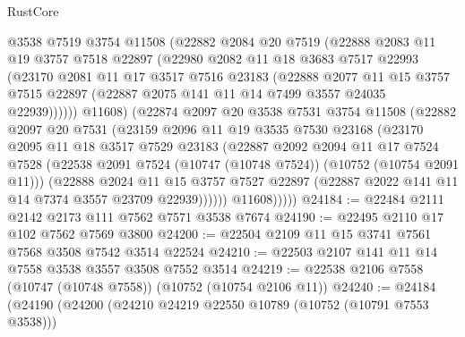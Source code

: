 \begin{lexlean}{RustCore}
\begin{coremodule}
              @3538
              @7519
              @3754
              @11508
              (@22882
                @2084
                @20
                @7519
                (@22888
                  @2083
                  @11
                  @19
                  @3757
                  @7518
                  @22897
                  (@22980
                    @2082
                    @11
                    @18
                    @3683
                    @7517
                    @22993
                    (@23170
                      @2081
                      @11
                      @17
                      @3517
                      @7516
                      @23183
                      (@22888
                        @2077
                        @11
                        @15
                        @3757
                        @7515
                        @22897
                        (@22887 @2075 @141 @11 @14 @7499 @3557 @24035 @22939))))))
              @11608)
            (@22874
              @2097
              @20
              @3538
              @7531
              @3754
              @11508
              (@22882
                @2097
                @20
                @7531
                (@23159
                  @2096
                  @11
                  @19
                  @3535
                  @7530
                  @23168
                  (@23170
                    @2095
                    @11
                    @18
                    @3517
                    @7529
                    @23183
                    (@22887
                      @2092
                      @2094
                      @11
                      @17
                      @7524
                      @7528
                      (@22538 @2091 @7524 (@10747 (@10748 @7524)) (@10752 (@10754 @2091 @11)))
                      (@22888
                        @2024
                        @11
                        @15
                        @3757
                        @7527
                        @22897
                        (@22887 @2022 @141 @11 @14 @7374 @3557 @23709 @22939))))))
              @11608)))))
@24184 := @22484 @2111 @2142 @2173 @111 @7562 @7571 @3538 @7674
@24190 := @22495 @2110 @17 @102 @7562 @7569 @3800
@24200 := @22504 @2109 @11 @15 @3741 @7561 @7568 @3508 @7542 @3514 @22524
@24210 := @22503 @2107 @141 @11 @14 @7558 @3538 @3557 @3508 @7552 @3514
@24219 := @22538 @2106 @7558 (@10747 (@10748 @7558)) (@10752 (@10754 @2106 @11))
@24240 := @24184
    (@24190
      (@24200
        (@24210 @24219 @22550 @10789 (@10752 (@10791 @7553 @3538)))

\end{coremodule}
\end{lexlean}
